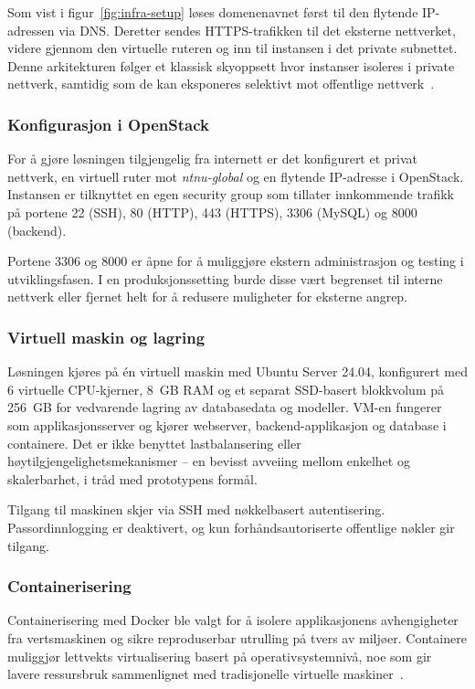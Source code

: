 Som vist i figur~\ref{fig:infra-setup} løses domenenavnet først
til den flytende IP-adressen via DNS. Deretter sendes HTTPS-trafikken
til det eksterne nettverket, videre gjennom den virtuelle ruteren
og inn til instansen i det private subnettet. Denne
arkitekturen følger et klassisk skyoppsett hvor instanser isoleres i
private nettverk, samtidig som de kan eksponeres selektivt mot
offentlige nettverk~\cite{nist-cloud}.

\subsubsection{Konfigurasjon i OpenStack}

For å gjøre løsningen tilgjengelig fra internett er det konfigurert et
privat nettverk, en virtuell ruter mot \textit{ntnu-global} og en
flytende IP-adresse i OpenStack. Instansen er tilknyttet en egen
security group som tillater innkommende trafikk på portene 22 (SSH),
80 (HTTP), 443 (HTTPS), 3306 (MySQL) og 8000 (backend).

Portene 3306 og 8000 er åpne for å muliggjøre ekstern administrasjon
og testing i utviklingsfasen. I en produksjonssetting burde disse vært
begrenset til interne nettverk eller fjernet helt for å redusere
muligheter for eksterne angrep.

\subsubsection{Virtuell maskin og lagring}

Løsningen kjøres på én virtuell maskin med Ubuntu Server 24.04, konfigurert med
6 virtuelle CPU-kjerner, 8~GB RAM og et separat SSD-basert blokkvolum på 256~GB
for vedvarende lagring av databasedata og modeller. VM-en fungerer som
applikasjonsserver og kjører webserver, backend-applikasjon og database i containere.
Det er ikke benyttet lastbalansering eller høytilgjengelighetsmekanismer -- en bevisst
avveiing mellom enkelhet og skalerbarhet, i tråd med prototypens formål.

Tilgang til maskinen skjer via SSH med nøkkelbasert autentisering.
Passordinnlogging er deaktivert, og kun forhåndsautoriserte offentlige
nøkler gir tilgang.

\subsubsection{Containerisering}

Containerisering med Docker ble valgt for å isolere applikasjonens
avhengigheter fra vertsmaskinen og sikre reproduserbar utrulling på
tvers av miljøer. Containere muliggjør lettvekts virtualisering basert
på operativsystemnivå, noe som gir lavere ressursbruk sammenlignet med
tradisjonelle virtuelle maskiner~\cite{pahl2015containers}.


